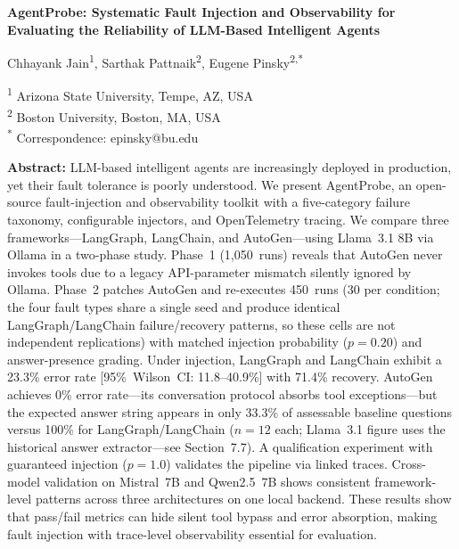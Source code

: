 \documentclass[12pt,a4paper]{article}
\begin{document}
\begin{center}
{\Large\bfseries AgentProbe: Systematic Fault Injection and Observability for Evaluating the Reliability of LLM-Based Intelligent Agents}

\vspace{1em}

{\large Chhayank Jain\textsuperscript{1}, Sarthak Pattnaik\textsuperscript{2}, Eugene Pinsky\textsuperscript{2,*}}

\vspace{0.5em}

\textsuperscript{1} Arizona State University, Tempe, AZ, USA\\
\textsuperscript{2} Boston University, Boston, MA, USA\\[0.3em]
\textsuperscript{*} Correspondence: epinsky@bu.edu
\end{center}

\vspace{1.5em}

\noindent\textbf{Abstract:}
LLM-based intelligent agents are increasingly deployed in production, yet their fault tolerance is poorly understood. We present AgentProbe, an open-source fault-injection and observability toolkit with a five-category failure taxonomy, configurable injectors, and OpenTelemetry tracing. We compare three frameworks---LangGraph, LangChain, and AutoGen---using Llama~3.1 8B via Ollama in a two-phase study. Phase~1 (1,050~runs) reveals that AutoGen never invokes tools due to a legacy API-parameter mismatch silently ignored by Ollama. Phase~2 patches AutoGen and re-executes 450~runs (30 per condition; the four fault types share a single seed and produce identical LangGraph/LangChain failure/recovery patterns, so these cells are not independent replications) with matched injection probability ($p = 0.20$) and answer-presence grading. Under injection, LangGraph and LangChain exhibit a 23.3\% error rate [95\%~Wilson~CI: 11.8--40.9\%] with 71.4\% recovery. AutoGen achieves 0\% error rate---its conversation protocol absorbs tool exceptions---but the expected answer string appears in only 33.3\% of assessable baseline questions versus 100\% for LangGraph/LangChain ($n = 12$ each; Llama~3.1 figure uses the historical answer extractor---see Section~7.7). A qualification experiment with guaranteed injection ($p = 1.0$) validates the pipeline via linked traces. Cross-model validation on Mistral~7B and Qwen2.5~7B shows consistent framework-level patterns across three architectures on one local backend. These results show that pass/fail metrics can hide silent tool bypass and error absorption, making fault injection with trace-level observability essential for evaluation.
\end{document}

